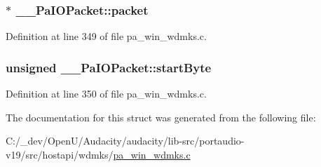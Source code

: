 \subsubsection[{\texorpdfstring{packet}{packet}}]{$\ast$ \+\_\+\+\_\+\+Pa\+I\+O\+Packet\+::packet}\hypertarget{struct_____pa_i_o_packet_af9b39c3b9381b31ad27daf1d9689e9ae}{}\label{struct_____pa_i_o_packet_af9b39c3b9381b31ad27daf1d9689e9ae}


Definition at line 349 of file pa\+\_\+win\+\_\+wdmks.\+c.

\subsubsection[{\texorpdfstring{start\+Byte}{startByte}}]{\setlength{\rightskip}{0pt plus 5cm}unsigned \+\_\+\+\_\+\+Pa\+I\+O\+Packet\+::start\+Byte}\hypertarget{struct_____pa_i_o_packet_aac33f08703b3e5553760a3e1e0d68714}{}\label{struct_____pa_i_o_packet_aac33f08703b3e5553760a3e1e0d68714}


Definition at line 350 of file pa\+\_\+win\+\_\+wdmks.\+c.



The documentation for this struct was generated from the following file\+:\begin{DoxyCompactItemize}
\item 
C\+:/\+\_\+dev/\+Open\+U/\+Audacity/audacity/lib-\/src/portaudio-\/v19/src/hostapi/wdmks/\hyperlink{pa__win__wdmks_8c}{pa\+\_\+win\+\_\+wdmks.\+c}\end{DoxyCompactItemize}
